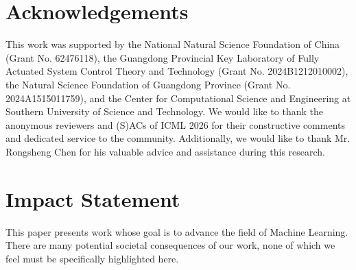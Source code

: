 \documentclass{article}
\theoremstyle{plain}
\theoremstyle{definition}
\theoremstyle{remark}
\begin{document}
\section*{Acknowledgements}
This work was supported by the National Natural Science Foundation of China (Grant No. 62476118), the Guangdong Provincial Key Laboratory of Fully Actuated System Control Theory and Technology (Grant No. 2024B1212010002), the Natural Science Foundation of Guangdong Province (Grant No. 2024A1515011759), and the Center for Computational Science and Engineering at Southern University of Science and Technology. We would like to thank the anonymous reviewers and (S)ACs of ICML 2026 for their constructive comments and dedicated service to the community. Additionally, we would like to thank Mr. Rongsheng Chen for his valuable advice and assistance during this research.

\section*{Impact Statement}
This paper presents work whose goal is to advance the field of Machine Learning. There are many potential societal consequences of our work, none of which we feel must be specifically highlighted here.

\end{document}
